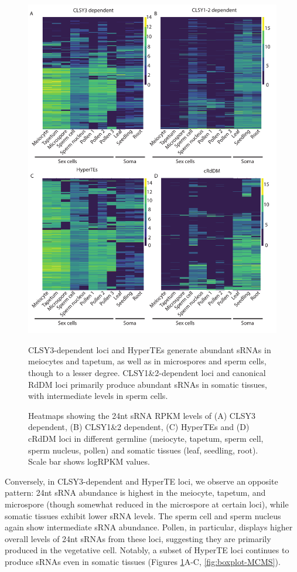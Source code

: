 \begin{figure}[htbp!] 
\centering    
    \includegraphics[width=1\textwidth]{Chapter2/Figs/Figure8_Heatmaps_CLSY3_CLSY1_2vs_cRdDMs_HyperTEs.pdf}
\caption{CLSY3-dependent loci and HyperTEs generate abundant sRNAs in meiocytes and tapetum, as well as in microspores and sperm cells, though to a lesser degree. CLSY1\&2-dependent loci and canonical RdDM loci primarily produce abundant sRNAs in somatic tissues, with intermediate levels in sperm cells.}
\label{fig:hm_CLSY3_CLSY1}
\captionsetup{font=small}
    \caption*{Heatmaps showing the 24nt sRNA RPKM levels of (A) CLSY3 dependent, (B) CLSY1\&2 dependent, (C) HyperTEs and (D) cRdDM loci in different germline (meiocyte, tapetum, sperm cell, sperm nucleus, pollen) and somatic tissues (leaf, seedling, root). Scale bar shows logRPKM values.}
\end{figure}

Conversely, in CLSY3-dependent and HyperTE loci, we observe an opposite pattern: 24nt sRNA abundance is highest in the meiocyte, tapetum, and microspore (though somewhat reduced in the microspore at certain loci), while somatic tissues exhibit lower sRNA levels. The sperm cell and sperm nucleus again show intermediate sRNA abundance. Pollen, in particular, displays higher overall levels of 24nt sRNAs from these loci, suggesting they are primarily produced in the vegetative cell. Notably, a subset of HyperTE loci continues to produce sRNAs even in somatic tissues (Figures \ref{fig:hm_CLSY3_CLSY1}A-C, \ref{fig:boxplot-MCMS}).

